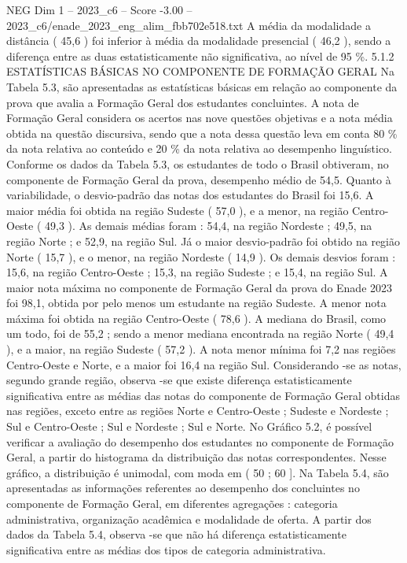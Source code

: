 \begin{textsample}{NEG Dim 1 – 2023\_c6 – Score -3.00 – 2023\_c6/enade\_2023\_eng\_alim\_fbb702e518.txt}
A média da modalidade a distância ( 45,6 ) foi inferior à média da modalidade presencial ( 46,2 ), sendo a diferença entre as duas estatisticamente não significativa, ao nível de 95 \%. 5.1.2 ESTATÍSTICAS BÁSICAS NO COMPONENTE DE FORMAÇÃO GERAL Na Tabela 5.3, são apresentadas as estatísticas básicas em relação ao componente da prova que avalia a Formação Geral dos estudantes concluintes.
A nota de Formação Geral considera os acertos nas nove questões objetivas e a nota média obtida na questão discursiva, sendo que a nota dessa questão leva em conta 80 \% da nota relativa ao conteúdo e 20 \% da nota relativa ao desempenho linguístico.
Conforme os dados da Tabela 5.3, os estudantes de todo o Brasil obtiveram, no componente de Formação Geral da prova, desempenho médio de 54,5.
Quanto à variabilidade, o desvio-padrão das notas dos estudantes do Brasil foi 15,6.
A maior média foi obtida na região Sudeste ( 57,0 ), e a menor, na região Centro-Oeste ( 49,3 ).
As demais médias foram : 54,4, na região Nordeste ; 49,5, na região Norte ; e 52,9, na região Sul.
Já o maior desvio-padrão foi obtido na região Norte ( 15,7 ), e o menor, na região Nordeste ( 14,9 ).
Os demais desvios foram : 15,6, na região Centro-Oeste ; 15,3, na região Sudeste ; e 15,4, na região Sul.
A maior nota máxima no componente de Formação Geral da prova do Enade 2023 foi 98,1, obtida por pelo menos um estudante na região Sudeste.
A menor nota máxima foi obtida na região Centro-Oeste ( 78,6 ).
A mediana do Brasil, como um todo, foi de 55,2 ; sendo a menor mediana encontrada na região Norte ( 49,4 ), e a maior, na região Sudeste ( 57,2 ).
A nota menor mínima foi 7,2 nas regiões Centro-Oeste e Norte, e a maior foi 16,4 na região Sul.
Considerando -se as notas, segundo grande região, observa -se que existe diferença estatisticamente significativa entre as médias das notas do componente de Formação Geral obtidas nas regiões, exceto entre as regiões Norte e Centro-Oeste ; Sudeste e Nordeste ; Sul e Centro-Oeste ; Sul e Nordeste ; Sul e Norte.
No Gráfico 5.2, é possível verificar a avaliação do desempenho dos estudantes no componente de Formação Geral, a partir do histograma da distribuição das notas correspondentes.
Nesse gráfico, a distribuição é unimodal, com moda em ( 50 ; 60 ].
Na Tabela 5.4, são apresentadas as informações referentes ao desempenho dos concluintes no componente de Formação Geral, em diferentes agregações : categoria administrativa, organização acadêmica e modalidade de oferta.
A partir dos dados da Tabela 5.4, observa -se que não há diferença estatisticamente significativa entre as médias dos tipos de categoria administrativa.

\end{textsample}
